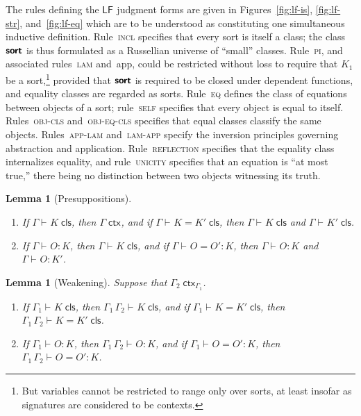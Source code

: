 \documentclass[11pt,twoside]{article}
\newtheorem{lemma}[theorem]{Lemma}
\newcommand{\LF}[1][]{\ensuremath{\mathsf{LF}_{#1}}}
\newcommand{\sortclass}{\ensuremath{\textbf{\textsf{sort}}}}
\newcommand{\appctx}[2]{{#1}\,{#2}}
\newcommand{\isctx}[2][]{{#2}\;\mathsf{ctx}_{#1}}
\newcommand{\iscls}[3][]{{#2}\vdash_{#1}{#3}\;\mathsf{cls}}
\newcommand{\eqcls}[4][]{{#2}\vdash_{#1}{#3}={#4}\;\mathsf{cls}}
\newcommand{\isobj}[4][]{{#2}\vdash_{#1}{#3}:{#4}}
\newcommand{\eqobj}[5][]{{#2}\vdash_{#1}{#3}={#4}:{#5}}
\begin{document}
The rules defining the \LF{} judgment forms are given in Figures~\ref{fig:lf-is},
\ref{fig:lf-str}, and~\ref{fig:lf-eq} which are to be understood as constituting one
simultaneous inductive definition.  Rule~\textsc{incl} specifies that every sort is itself
a class; the class $\sortclass$ is thus formulated as a Russellian universe of ``small''
classes.  Rule~\textsc{pi}, and associated rules~\textsc{lam} and~\textsf{app}, could be
restricted without loss to require that $K_{1}$ be a sort,\footnote{But variables cannot
  be restricted to range only over sorts, at least insofar as signatures are considered to
  be contexts.} provided that \sortclass{} is required to be closed under dependent
functions, and equality classes are regarded as sorts.  Rule~\textsc{eq} defines the class
of equations between objects of a sort; rule~\textsc{self} specifies that every object is
equal to itself.  Rules~\textsc{obj-cls} and~\textsc{obj-eq-cls} specifies that equal
classes classify the same objects.  Rules~\textsc{app-lam} and~\textsc{lam-app} specify
the inversion principles governing abstraction and application.  Rule~\textsc{reflection}
specifies that the equality class internalizes equality, and rule~\textsc{unicity}
specifies that an equation is ``at most true,'' there being no distinction between two
objects witnessing its truth.

\begin{lemma}[Presuppositions]
  \label{lemma:presup}
  \begin{enumerate}
  \item If\/ $\iscls{\Gamma}{K}$, then $\isctx{\Gamma}$, and if\/ $\eqcls{\Gamma}{K}{K'}$, then $\iscls{\Gamma}{K}$
    and $\iscls{\Gamma}{K'}$.
  \item If\/ $\isobj{\Gamma}{O}{K}$, then $\iscls{\Gamma}{K}$, and if\/ $\eqobj{\Gamma}{O}{O'}{K}$, then
    $\isobj{\Gamma}{O}{K}$ and $\isobj{\Gamma}{O}{K'}$.
  \end{enumerate}
\end{lemma}

\begin{lemma}[Weakening]
  \label{lemma:weak}
  Suppose that $\isctx[\Gamma_1]{\Gamma_2}$.
  \begin{enumerate}
  \item If\/ $\iscls{\Gamma_1}{K}$, then $\iscls{\appctx{\Gamma_{1}}{\Gamma_2}}{K}$, and if\/
    $\eqcls{\Gamma_1}{K}{K'}$, then $\eqcls{\appctx{\Gamma_1}{\Gamma_2}}{K}{K'}$.
  \item If\/ $\isobj{\Gamma_1}{O}{K}$, then $\isobj{\appctx{\Gamma_1}{\Gamma_2}}{O}{K}$, and if\/
    $\eqobj{\Gamma_1}{O}{O'}{K}$, then $\eqobj{\appctx{\Gamma_1}{\Gamma_2}}{O}{O'}{K}$.
  \end{enumerate}
\end{lemma}
\end{document}
